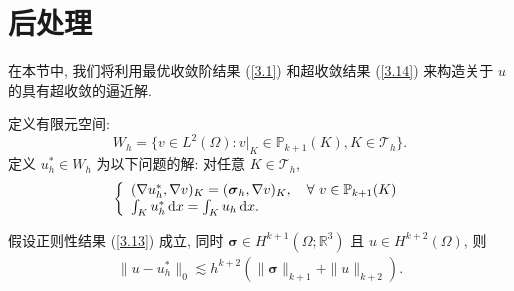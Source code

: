 	\section{后处理}
	在本节中, 我们将利用最优收敛阶结果 (\ref{3.1}) 和超收敛结果 (\ref{3.14}) 来构造关于 $u$ 的具有超收敛的逼近解.
	
	定义有限元空间:
	$$W_h=\{v\in L^2(\Omega): v|_K\in\mathbb{P}_{k+1}(K), K\in\mathcal{T}_h\}.$$
	定义 $u_h^\ast\in W_h$ 为以下问题的解: 对任意 $K\in\mathcal{T}_h$,
	\begin{align}
		\label{4.1}
		\left\{
		\begin{array}{ll}
			(\nabla u_h^\ast,\nabla v)_K = (\boldsymbol\sigma_h,\nabla v)_K, \quad \forall \ v\in\mathbb{P}_{k+1}(K)\\
			\int_K  u_h^\ast\,{\rm d}x = \int_K  u_h\,{\rm d}x.
		\end{array}
		\right.
	\end{align}
	\begin{theorem}
		假设正则性结果 (\ref{3.13}) 成立, 同时 $\boldsymbol\sigma\in H^{k+1}(\Omega;\mathbb{R}^3)$ 且 $u\in H^{k+2}(\Omega)$, 则
		\begin{align}
			\label{4.2}
			\|u-u^\ast_h\|_0\lesssim h^{k+2}(\|\boldsymbol\sigma\|_{k+1}+\|u\|_{k+2}).
		\end{align}
	\end{theorem}
